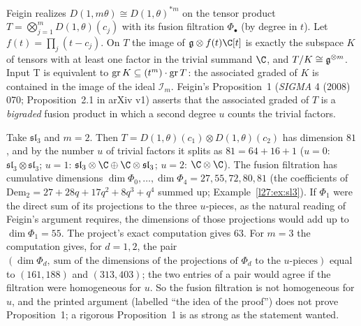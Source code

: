 Feigin realizes $D(1,m\theta)\cong D(1,\theta)^{*m}$ on the tensor product $T=\bigotimes_{j=1}^mD(1,\theta)(c_j)$ with its fusion filtration
$\Phi_\bullet$ (by degree in $t$). Let $f(t)=\prod_j(t-c_j)$. On $T$ the image of $\ltwentyseveng\otimes f(t)\C[t]$ is exactly the subspace $K$
of tensors with at least one factor in the trivial summand $\C$, and $T/K\cong\mathfrak g^{\otimes m}$. Input T is equivalent to
$\operatorname{gr} K\subseteq(t^m)\cdot\operatorname{gr} T$: the associated graded of $K$ is contained in the image of the ideal $\mathcal I_m$.
Feigin's Proposition~1 (\emph{SIGMA} 4 (2008) 070; Proposition~2.1 in arXiv v1) asserts that the associated graded of $T$ is a \emph{bigraded} fusion product in which a second degree $u$
counts the trivial factors.

Take $\mathfrak{sl}_3$ and $m=2$. Then $T=D(1,\theta)(c_1)\otimes D(1,\theta)(c_2)$ has dimension $81$, and by the number $u$ of trivial
factors it splits as $81=64+16+1$ ($u=0$: $\mathfrak{sl}_3\otimes\mathfrak{sl}_3$; $u=1$: $\mathfrak{sl}_3\otimes\C\oplus\C\otimes\mathfrak{sl}_3$;
$u=2$: $\C\otimes\C$). The fusion filtration has cumulative dimensions $\dim\Phi_0,\dots,\dim\Phi_4=27,55,72,80,81$ (the coefficients
of $\mathrm{Dem}_2=27+28q+17q^2+8q^3+q^4$ summed up; Example~\ref{l27:ex:sl3}). If $\Phi_1$ were the direct sum of its projections to the
three $u$-pieces, as the natural reading of Feigin's argument requires, the dimensions of those projections would add up to
$\dim\Phi_1=55$. The project's exact computation gives $63$. For $m=3$ the computation gives, for $d=1,2$, the pair $(\dim\Phi_d,\ \text{sum of the dimensions of the projections of }\Phi_d\text{ to the }u\text{-pieces})$ equal to $(161,188)$ and $(313,403)$; the two entries of a pair would agree if the filtration were homogeneous for $u$. So the fusion
filtration is not homogeneous for $u$, and the printed argument (labelled ``the idea of the proof'') does not prove Proposition~1; a rigorous
Proposition~1 is as strong as the statement wanted.

